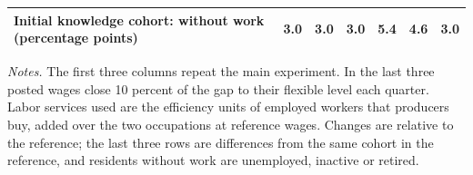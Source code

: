 \begin{table}[htbp]
\begin{tabularx}{\linewidth}{@{}>{\raggedright\arraybackslash}Xrrrrrr@{}}
Initial knowledge cohort: without work (percentage points) & 3.0 & 3.0 & 3.0 & 5.4 & 4.6 & 3.0 \\
\bottomrule\end{tabularx}
\par\smallskip\begin{minipage}{\linewidth}\footnotesize\emph{Notes.} The first three columns repeat the main experiment. In the last three posted wages close 10 percent of the gap to their flexible level each quarter. Labor services used are the efficiency units of employed workers that producers buy, added over the two occupations at reference wages. Changes are relative to the reference; the last three rows are differences from the same cohort in the reference, and residents without work are unemployed, inactive or retired.\end{minipage}
\end{table}
